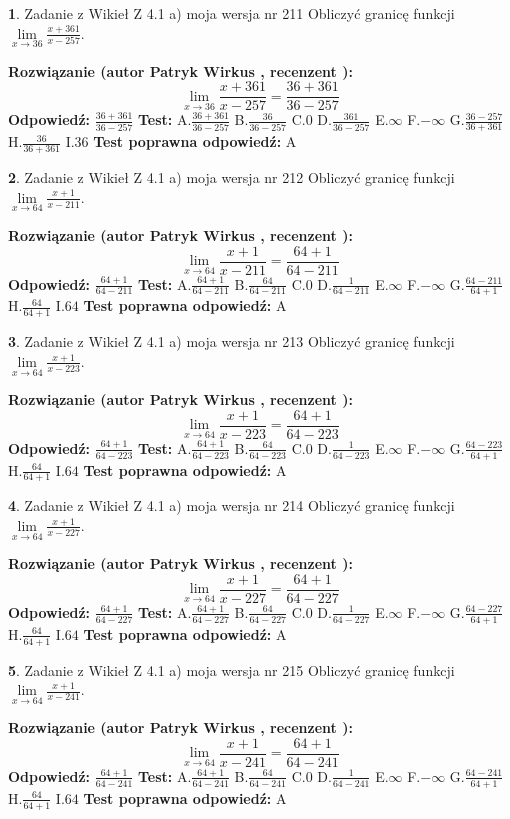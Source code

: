 \documentclass[12pt, a4paper]{article}
\theoremstyle{definition} %
\newtheorem{zad}{}
\newcommand{\zadStart}[1]{\begin{zad}#1\newline}
\newcommand{\zadStop}{\end{zad}}
\newcommand{\rozwStart}[2]{\noindent \textbf{Rozwiązanie (autor #1 , recenzent #2): }\newline}
\newcommand{\rozwStop}{\newline}
\newcommand{\odpStart}{\noindent \textbf{Odpowiedź:}\newline}
\newcommand{\odpStop}{\newline}
\newcommand{\testStart}{\noindent \textbf{Test:}\newline}
\newcommand{\testStop}{\newline}
\newcommand{\kluczStart}{\noindent \textbf{Test poprawna odpowiedź:}\newline}
\newcommand{\kluczStop}{\newline}
\begin{document}
\zadStart{Zadanie z Wikieł Z 4.1 a) moja wersja nr 211}
Obliczyć granicę funkcji $\lim\limits_{x\to36}\frac{x+361}{x-257}$.
\zadStop
\rozwStart{Patryk Wirkus}{}
$$\lim\limits_{x\to36}\frac{x+361}{x-257} = \frac{36+361}{36-257}$$
\rozwStop
\odpStart
$\frac{36+361}{36-257}$
\odpStop
\testStart
A.$\frac{36+361}{36-257}$
B.$\frac{36}{36-257}$
C.$0$
D.$\frac{361}{36-257}$
E.$\infty$
F.$-\infty$
G.$\frac{36-257}{36+361}$
H.$\frac{36}{36+361}$
I.$36$
\testStop
\kluczStart
A
\kluczStop



\zadStart{Zadanie z Wikieł Z 4.1 a) moja wersja nr 212}
Obliczyć granicę funkcji $\lim\limits_{x\to64}\frac{x+1}{x-211}$.
\zadStop
\rozwStart{Patryk Wirkus}{}
$$\lim\limits_{x\to64}\frac{x+1}{x-211} = \frac{64+1}{64-211}$$
\rozwStop
\odpStart
$\frac{64+1}{64-211}$
\odpStop
\testStart
A.$\frac{64+1}{64-211}$
B.$\frac{64}{64-211}$
C.$0$
D.$\frac{1}{64-211}$
E.$\infty$
F.$-\infty$
G.$\frac{64-211}{64+1}$
H.$\frac{64}{64+1}$
I.$64$
\testStop
\kluczStart
A
\kluczStop



\zadStart{Zadanie z Wikieł Z 4.1 a) moja wersja nr 213}
Obliczyć granicę funkcji $\lim\limits_{x\to64}\frac{x+1}{x-223}$.
\zadStop
\rozwStart{Patryk Wirkus}{}
$$\lim\limits_{x\to64}\frac{x+1}{x-223} = \frac{64+1}{64-223}$$
\rozwStop
\odpStart
$\frac{64+1}{64-223}$
\odpStop
\testStart
A.$\frac{64+1}{64-223}$
B.$\frac{64}{64-223}$
C.$0$
D.$\frac{1}{64-223}$
E.$\infty$
F.$-\infty$
G.$\frac{64-223}{64+1}$
H.$\frac{64}{64+1}$
I.$64$
\testStop
\kluczStart
A
\kluczStop



\zadStart{Zadanie z Wikieł Z 4.1 a) moja wersja nr 214}
Obliczyć granicę funkcji $\lim\limits_{x\to64}\frac{x+1}{x-227}$.
\zadStop
\rozwStart{Patryk Wirkus}{}
$$\lim\limits_{x\to64}\frac{x+1}{x-227} = \frac{64+1}{64-227}$$
\rozwStop
\odpStart
$\frac{64+1}{64-227}$
\odpStop
\testStart
A.$\frac{64+1}{64-227}$
B.$\frac{64}{64-227}$
C.$0$
D.$\frac{1}{64-227}$
E.$\infty$
F.$-\infty$
G.$\frac{64-227}{64+1}$
H.$\frac{64}{64+1}$
I.$64$
\testStop
\kluczStart
A
\kluczStop



\zadStart{Zadanie z Wikieł Z 4.1 a) moja wersja nr 215}
Obliczyć granicę funkcji $\lim\limits_{x\to64}\frac{x+1}{x-241}$.
\zadStop
\rozwStart{Patryk Wirkus}{}
$$\lim\limits_{x\to64}\frac{x+1}{x-241} = \frac{64+1}{64-241}$$
\rozwStop
\odpStart
$\frac{64+1}{64-241}$
\odpStop
\testStart
A.$\frac{64+1}{64-241}$
B.$\frac{64}{64-241}$
C.$0$
D.$\frac{1}{64-241}$
E.$\infty$
F.$-\infty$
G.$\frac{64-241}{64+1}$
H.$\frac{64}{64+1}$
I.$64$
\testStop
\kluczStart
A
\kluczStop
\end{document}
